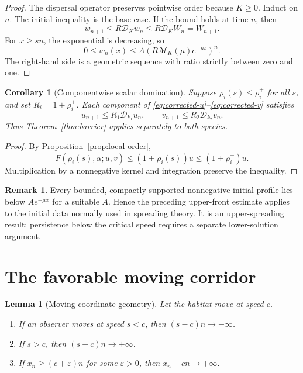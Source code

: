 \documentclass[11pt]{article}
\newtheorem{lemma}[theorem]{Lemma}
\newtheorem{corollary}[theorem]{Corollary}
\theoremstyle{definition}
\newtheorem{remark}[theorem]{Remark}
\newcommand{\Fhat}{\widehat F}
\newcommand{\M}{\mathcal M}
\newcommand{\D}{\mathcal D}
\begin{document}
\begin{proof}
The dispersal operator preserves pointwise order because \(K\geq0\).
Induct on \(n\).  The initial inequality is the base case.  If the bound
holds at time \(n\), then
\[
  w_{n+1}
  \leq R\D_Kw_n
  \leq R\D_KW_n
  =W_{n+1}.
\]
For \(x\geq sn\), the exponential is decreasing, so
\[
  0\leq w_n(x)
  \leq
  A\left(R\M_K(\mu)e^{-\mu s}\right)^n.
\]
The right-hand side is a geometric sequence with ratio strictly between
zero and one.
\end{proof}

\begin{corollary}[Componentwise scalar domination]
\label{cor:scalar-domination}
Suppose \(\rho_i(s)\leq\rho_i^+\) for all \(s\), and set
\(R_i=1+\rho_i^+\).  Each component of
\eqref{eq:corrected-u}--\eqref{eq:corrected-v} satisfies
\[
  u_{n+1}\leq R_1\D_{k_1}u_n,
  \qquad
  v_{n+1}\leq R_2\D_{k_2}v_n.
\]
Thus Theorem~\ref{thm:barrier} applies separately to both species.
\end{corollary}

\begin{proof}
By Proposition~\ref{prop:local-order},
\[
  \Fhat(\rho_i(s),\alpha;u,v)
  \leq(1+\rho_i(s))u
  \leq(1+\rho_i^+)u.
\]
Multiplication by a nonnegative kernel and integration preserve the
inequality.
\end{proof}

\begin{remark}
Every bounded, compactly supported nonnegative initial profile lies below
\(Ae^{-\mu x}\) for a suitable \(A\).  Hence the preceding upper-front
estimate applies to the initial data normally used in spreading theory.
It is an upper-spreading result; persistence below the critical speed
requires a separate lower-solution argument.
\end{remark}

\section{The favorable moving corridor}

\begin{lemma}[Moving-coordinate geometry]
\label{lem:moving-coordinate}
Let the habitat move at speed \(c\).
\begin{enumerate}[label=(\roman*)]
  \item If an observer moves at speed \(s<c\), then
        \((s-c)n\to-\infty\).
  \item If \(s>c\), then \((s-c)n\to+\infty\).
  \item If \(x_n\geq(c+\varepsilon)n\) for some \(\varepsilon>0\), then
        \(x_n-cn\to+\infty\).
\end{enumerate}
\end{lemma}
\end{document}

